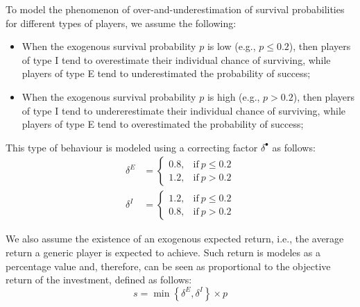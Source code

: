 \documentclass{article}
\begin{document}
To model the phenomenon of over-and-underestimation of survival probabilities
for different types of players, we assume the following:
\begin{itemize}
\item When the exogenous survival probability $p$ is low (e.g., $p \leq
0.2$), then players of type I tend to overestimate their individual chance of
surviving, while players of type E tend to underestimated the probability of
success;
\item When the exogenous survival probability $p$ is high (e.g., $p >
0.2$), then players of type I tend to undererestimate their individual chance of
surviving, while players of type E tend to overestimated the probability of
success;
\end{itemize}
This type of behaviour is modeled using a correcting factor $\delta^\bullet$ as
follows:
\begin{eqnarray}
\delta^E &=
\begin{cases}
0.8, & \text{if}~p \leq 0.2\\
1.2, & \text{if}~p > 0.2
\end{cases}
\label{eq:over-underestimation_E} \\
\delta^I &=
\begin{cases}
1.2, & \text{if}~p \leq 0.2\\
0.8, & \text{if}~p > 0.2
\end{cases}
\label{eq:over-underestimation_I}
\end{eqnarray}

We also assume the existence of an exogenous expected return, i.e., the average
return a generic player is expected to achieve. Such return is modeles as a
percentage value and, therefore, can be seen as proportional to the objective
return of the investment, defined as follows:
\begin{equation}
s = \min\left\{ \delta^E, \delta^I \right\}\times p
\label{eq:expected-return-s}
\end{equation}
\end{document}
